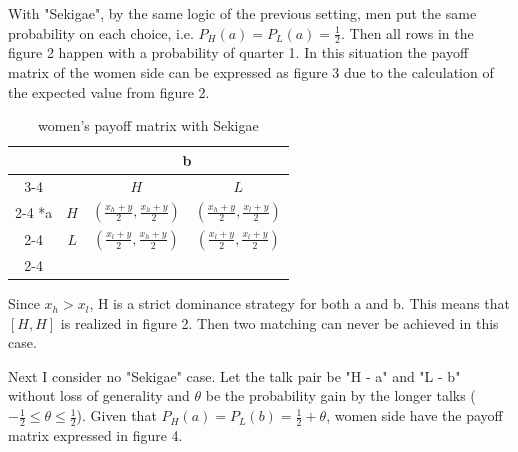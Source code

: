 \documentclass{article}
\begin{document}
          \par
          With "Sekigae", by the same logic of the previous setting, men put the same probability on each choice, i.e. $P_H(a) = P_L(a) = \frac{1}{2}$. Then all rows in the figure 2 happen with a probability of quarter 1. In this situation the payoff matrix of the women side can be expressed as figure 3 due to the calculation of the expected value from figure 2.

	\begin{table}[h]
		\begin{center}
		\begingroup
                \renewcommand{\arraystretch}{1.5}
                \setlength{\extrarowheight}{2pt}
                \begin{tabular}{*{4}{c|}}
                  \multicolumn{2}{c}{} & \multicolumn{2}{c}{b}\\\cline{3-4}
                  \multicolumn{1}{c}{} &  & $H$  & $L$ \\\cline{2-4}
                  \multirow{2}*{a}  & $H$ & $(\frac{x_h+y}{2}, \frac{x_h+y}{2})$ & $(\frac{x_h+y}{2}, \frac{x_l+y}{2})$ \\\cline{2-4}
                  & $L$ & $(\frac{x_l+y}{2}, \frac{x_h+y}{2})$ & $(\frac{x_l+y}{2}, \frac{x_l+y}{2})$ \\\cline{2-4}
                \end{tabular}
                \endgroup
                \end{center}
                \caption{women's payoff matrix with Sekigae}
  	\end{table}
	
	\par
	Since $x_h > x_l$, H is a strict dominance strategy for both a and b. This means that $[H, H]$ is realized in figure 2. Then two matching can never be achieved in this case.
	\par
	Next I consider no "Sekigae" case. Let the talk pair be "H - a" and "L - b" without loss of generality and $\theta$ be the probability gain by the longer talks ($-\frac{1}{2} \leq \theta \leq \frac{1}{2}$). Given that $P_H(a) = P_L(b) = \frac{1}{2} + \theta$, women side have the payoff matrix expressed in figure 4.
		
\end{document}
